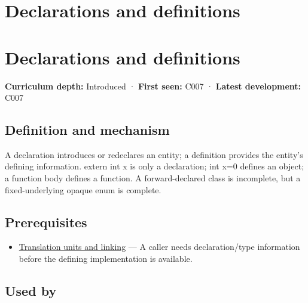 \hypertarget{appendix-2e4d494c2d94}{}
\section*{Declarations and definitions}
\section{Declarations and definitions}\label{declarations-and-definitions}

\textbf{Curriculum depth:} Introduced · \textbf{First seen:} C007 · \textbf{Latest development:} C007

\subsection{Definition and mechanism}\label{definition-and-mechanism}

A declaration introduces or redeclares an entity; a definition provides the entity's defining information. extern int x is only a declaration; int x=0 defines an object; a function body defines a function. A forward-declared class is incomplete, but a fixed-underlying opaque enum is complete.

\subsection{Prerequisites}\label{prerequisites}

\begin{itemize}
\tightlist
\item
  \hyperref[appendix-806686359e1b]{Translation units and linking} --- A caller needs declaration/type information before the defining implementation is available.
\end{itemize}

\subsection{Used by}\label{used-by}


